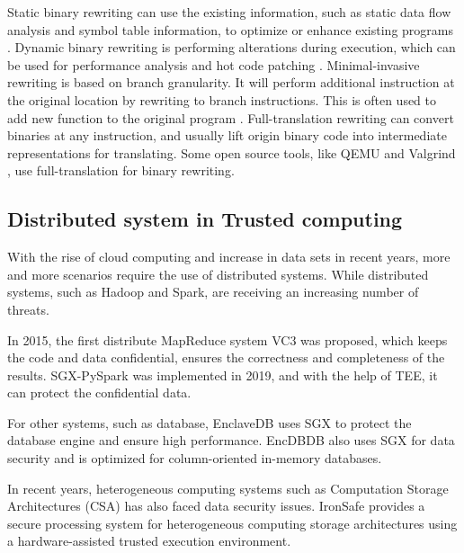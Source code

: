 Static binary rewriting can use the existing information, such as static data flow analysis and
symbol table information, to optimize or enhance existing programs \cite{10.1145/2629335, Schwarz2007PLTOAL}. 
Dynamic binary rewriting is performing alterations during execution, which can be used for
performance analysis \cite{Luk2005PinBC} and hot code patching \cite{Bruening2003AnIF}.
Minimal-invasive rewriting is based on branch granularity. It will perform additional instruction
at the original location by rewriting to branch instructions. This is often used to add new
function to the original program \cite{Federico2017revngAU}.
Full-translation rewriting can convert binaries at any instruction, and usually lift origin
binary code into intermediate representations for translating. Some open source tools,
like QEMU \cite{Bellard2005QEMUAF} and Valgrind \cite{Nethercote2007ValgrindAF},
use full-translation for binary rewriting.


\subsection{Distributed system in Trusted computing}
With the rise of cloud computing and increase in data sets in recent years,
more and more scenarios require the use of distributed systems.
While distributed systems, such as Hadoop and Spark, are receiving an increasing number
of threats.

In 2015, the first distribute MapReduce system VC3 \cite{Schuster2015VC3TD} was proposed,
which keeps the code and data confidential, ensures the correctness and completeness of the results.
SGX-PySpark \cite{Quoc2019SGXPySparkSD} was implemented in 2019, and with the help of TEE,
it can protect the confidential data.

For other systems, such as database, EnclaveDB \cite{Priebe2018EnclaveDBAS} uses SGX to
protect the database engine and ensure high performance.
EncDBDB \cite{Fuhry2021EncDBDBSE} also uses SGX for data security and is optimized for
column-oriented in-memory databases.

In recent years, heterogeneous computing systems such as Computation Storage Architectures (CSA) 
has also faced data security issues.
IronSafe \cite{Unnibhavi2022SecureAP} provides a secure processing system for heterogeneous
computing storage architectures using a hardware-assisted trusted execution environment.